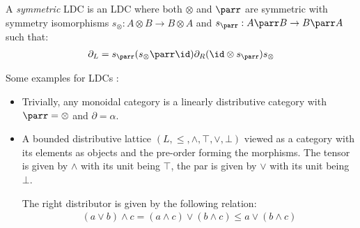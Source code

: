 \documentclass[DIN, pagenumber=false, fontsize=11pt, parskip=half, colorinlistoftodos, svgnames]{scrartcl}
\begin{document}
\begin{definition}
\begin{itemize}
\begin{center}
				\end{center}
		\end{itemize}
		
		A \emph{symmetric} LDC is an LDC where both $\otimes$ and $\parr$ are symmetric with symmetry isomorphisms 
		$s_\otimes : A \otimes B \rightarrow B \otimes A $ 
		and 
		$s_\parr : A \parr B \rightarrow B \parr A $ 
		such that:
		\begin{align*}
			\partial_L = s_\parr (s_\otimes \parr \id) \partial_R (\id \otimes s_\parr) s_\otimes
		\end{align*}
	\end{definition}
	
	\begin{example}
		Some examples for LDCs \cite[Definition 2.2]{srinavsan-thesis}:
		\begin{itemize}
			\item 
				Trivially, any monoidal category is a linearly distributive category with $\parr = \otimes$ and $\partial = \alpha$.
			\item 
				A bounded distributive lattice $(L, \leq, \wedge, \top, \vee, \bot ) $ viewed as a category with its elements as objects and the pre-order forming the morphisms. The tensor is given by $\wedge$ with its unit being $\top$, the par is given by $\vee$ with its unit being $\bot$.
				
				The right distributor is given by the following relation:
				\begin{align*}
					(a \vee b) \wedge c = (a \wedge c) \vee (b \wedge c) \leq a \vee (b \wedge c)
				\end{align*}

		\end{itemize}
	\end{example}
	
\end{document}
